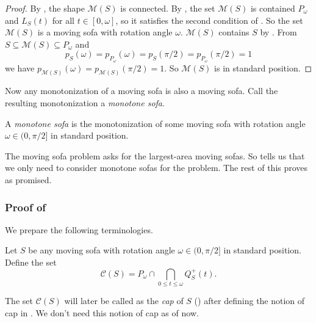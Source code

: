\begin{proof}
By , the shape \(\mathcal{M}(S)\) is connected. By , the set \(\mathcal{M}(S)\) is contained \(P_\omega\) and \(L_S(t)\) for all \(t \in [0, \omega]\), so it satisfies the second condition of . So the set \(\mathcal{M}(S)\) is a moving sofa with rotation angle \(\omega\). \(\mathcal{M}(S)\) contains \(S\) by . From \(S \subseteq \mathcal{M}(S) \subseteq P_\omega\) and
\[
p_S(\omega) = p_{P_\omega}(\omega) = p_S(\pi/2) = p_{P_\omega}(\pi/2) = 1
\]
we have \(p_{\mathcal{M}(S)}(\omega) = p_{\mathcal{M}(S)}(\pi/2) = 1\). So \(\mathcal{M}(S)\) is in standard position.
\end{proof}

Now any monotonization of a moving sofa is also a moving sofa. Call the resulting monotonization a \emph{monotone sofa}.

\begin{definition}

A \emph{monotone sofa} is the monotonization of some moving sofa with rotation angle \(\omega \in (0, \pi/2]\) in standard position.

\label{def:monotone-sofa}
\end{definition}

The moving sofa problem asks for the largest-area moving sofas. So  tells us that we only need to consider monotone sofas for the problem. The rest of this  proves  as promised.

\subsubsection{\texorpdfstring{Proof of }{Proof of }}

We prepare the following terminologies.

\begin{definition}

Let \(S\) be any moving sofa with rotation angle \(\omega \in (0, \pi/2]\) in standard position. Define the set
\[
\mathcal{C}(S) = P_\omega \cap \bigcap_{0 \leq t \leq \omega} Q^+_S(t).
\]

\label{def:cap-sofa}
\end{definition}

The set \(\mathcal{C}(S)\) will later be called as the \emph{cap} of \(S\) () after defining the notion of cap in . We don’t need this notion of cap as of now.

